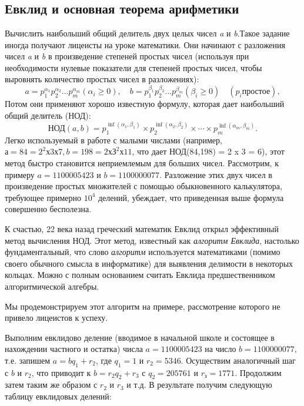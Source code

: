 \documentclass{mai_book}
\begin{document}
\chapter{}
\section{Евклид и основная теорема арифметики}
\noindent Вычислить наибольший общий делитель двух целых чисел {\it a} и {\it b}.Такое задание иногда получают лицеисты на уроке математики. Они начинают с разложения чисел {\it a} и {\it b} в произведение степеней простых чисел (используя при необходимости нулевые показатели для степеней простых чисел, чтобы выровнять количество простых чисел в разложениях): 
\[
 a=p_1^{\alpha_1}p_2^{\alpha_2}...p_m^{\alpha_m} (\alpha_i \geqslant 0), \quad b=p_1^{\beta_1}p_2^{\beta_2}...p_m^{\beta_m} (\beta_i \geqslant 0) \quad (p_i  \text{простое}),
\]
\noindent Потом они применяют хорошо известную формулу, которая дает наибольший общий делитель (НОД): 
\[
\text{НОД}(a,b)=p_1^{\inf (\alpha_1,\beta_1)} \times p_2^{\inf (\alpha_2,\beta_2)} \times \cdots \times p_m^{\inf (\alpha_m,\beta_m)}.
\]
Легко используемый в работе с малыми числами (например, $а = 84 = 2^2 х 3 х 7, b = 198 = 2 х З^2 х 11$, что дает НОД(84,198) = 2 x 3 = 6), этот метод быстро становится неприемлемым для больших чисел. Рассмотрим, к примеру $a = 1 100 005 423$ и $b = 1 100 000 077$. Разложение этих двух чисел в произведение простых множителей с помощью обыкновенного калькулятора, требующее примерно $10^4$ делений, убеждает, что приведенная выше формула совершенно бесполезна.

К счастью, 22 века назад греческий математик Евклид открыл эффективный метод вычисления НОД. Этот метод, известный как {\it алгоритм Евклида}, настолько фундаментальный, что слово {\it алгоритм} используется математиками (помимо своего обычного смысла в информатике) для выявления делимости в некоторых кольцах. Можно с полным основанием считать Евклида предшественником алгоритмической алгебры.

Мы продемонстрируем этот алгоритм на примере, рассмотрение которого не привело лицеистов к успеху. 
\newpage

Выполним евклидово деление (вводимое в начальной школе и состоящее в нахождении частного и остатка) числа $a = 1100 005 423$ на число $b = 1 100 000 077$, т.е. запишем $a = bq_1 + r_2$, где $q_1 = 1$ и $r_2 = 5346$. Осуществим аналогичный шаг с $b$ и $r_2$, что приводит к $b = r_2q_2 + r_3$ с $q_2 = 205 761$ и $r_з = 1771$. Продолжим затем таким же образом с $r_2$ и $r_3$ и т.д. В результате получим следующую таблицу евклидовых делений: 
\end{document}
